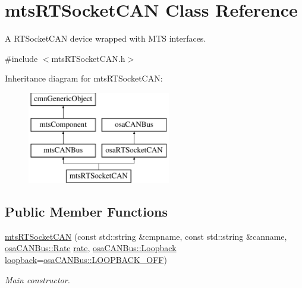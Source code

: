 \hypertarget{classmts_r_t_socket_c_a_n}{}\section{mts\+R\+T\+Socket\+C\+A\+N Class Reference}
\label{classmts_r_t_socket_c_a_n}


A R\+T\+Socket\+C\+A\+N device wrapped with M\+T\+S interfaces.  




{\ttfamily \#include $<$mts\+R\+T\+Socket\+C\+A\+N.\+h$>$}

Inheritance diagram for mts\+R\+T\+Socket\+C\+A\+N\+:\begin{figure}[H]
\begin{center}
\leavevmode
\includegraphics[height=4.000000cm]{d9/d75/classmts_r_t_socket_c_a_n}
\end{center}
\end{figure}
\subsection*{Public Member Functions}
\begin{DoxyCompactItemize}
\item 
\hyperlink{classmts_r_t_socket_c_a_n_ab6b31f3a14e92e5e0a7985c8e7ba691a}{mts\+R\+T\+Socket\+C\+A\+N} (const std\+::string \&cmpname, const std\+::string \&canname, \hyperlink{classosa_c_a_n_bus_ae977dbc0e1c16772395408c8e018fe6c}{osa\+C\+A\+N\+Bus\+::\+Rate} \hyperlink{classosa_c_a_n_bus_a4ff86a9ecf19161b1f34666888e0a331}{rate}, \hyperlink{classosa_c_a_n_bus_a992406c83a336e95fb4a09b0b13df786}{osa\+C\+A\+N\+Bus\+::\+Loopback} \hyperlink{classosa_c_a_n_bus_a724e9c478dd48908882e29f189d98968}{loopback}=\hyperlink{classosa_c_a_n_bus_a992406c83a336e95fb4a09b0b13df786ae2557509d0c1ac68029eeb6bdf6e703d}{osa\+C\+A\+N\+Bus\+::\+L\+O\+O\+P\+B\+A\+C\+K\+\_\+\+O\+F\+F})
\begin{DoxyCompactList}\small\item\em Main constructor. \end{DoxyCompactList}\end{DoxyCompactItemize}

